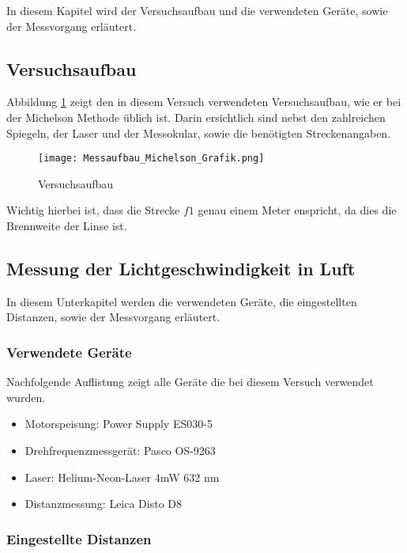 In diesem Kapitel wird der Versuchsaufbau und die verwendeten Geräte, sowie der Messvorgang erläutert.

\subsection{Versuchsaufbau}

Abbildung \ref{fig:Versuchaufbau} zeigt den in diesem Versuch verwendeten Versuchsaufbau, wie er bei der Michelson Methode üblich ist. Darin ersichtlich sind nebst den zahlreichen Spiegeln, der Laser und der Messokular, sowie die benötigten Streckenangaben.

\begin{figure}[htb]
\texttt{[image: Messaufbau\_Michelson\_Grafik.png]}
\caption{Versuchsaufbau}
\label{fig:Versuchaufbau}
\end{figure}

Wichtig hierbei ist, dass die Strecke $f1$ genau einem Meter enspricht, da dies die Brennweite der Linse ist.

\subsection{Messung der Lichtgeschwindigkeit in Luft}

In diesem Unterkapitel werden die verwendeten Geräte, die eingestellten Distanzen, sowie der Messvorgang erläutert.

\subsubsection{Verwendete Geräte}

Nachfolgende Auflistung zeigt alle Geräte die bei diesem Versuch verwendet wurden.

\begin{itemize}
\item Motorspeisung: Power Supply ES030-5
\item Drehfrequenzmessgerät: Pasco OS-9263
\item Laser: Helium-Neon-Laser 4mW 632 nm
\item Distanzmessung: Leica Disto D8
\end{itemize}

\subsubsection{Eingestellte Distanzen}

